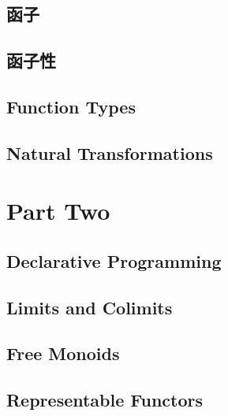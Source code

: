 \chapter{函子}\label{functors}


\chapter{函子性}\label{functoriality}


\chapter{Function Types}\label{function-types}


\chapter{Natural Transformations}\label{natural-transformations}


\part*{Part Two}

\chapter{Declarative Programming}\label{declarative-programming}


\chapter{Limits and Colimits}\label{limits-and-colimits}


\chapter{Free Monoids}\label{free-monoids}


\chapter{Representable Functors}\label{representable-functors}


